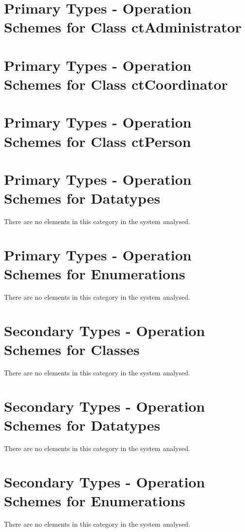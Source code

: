 \section{Primary Types - Operation Schemes for Class ctAdministrator} 
\label{OM-CM-PTClass-ctAdministrator}

\section{Primary Types - Operation Schemes for Class ctCoordinator} 
\label{OM-CM-PTClass-ctCoordinator}

\section{Primary Types - Operation Schemes for Class ctPerson} 
\label{OM-CM-PTClass-ctPerson}




\section{Primary Types - Operation Schemes for Datatypes}
There are no elements in this category in the system analysed.




\section{Primary Types - Operation Schemes for Enumerations}
There are no elements in this category in the system analysed.







\section{Secondary Types - Operation Schemes for Classes}
There are no elements in this category in the system analysed.





\section{Secondary Types - Operation Schemes for Datatypes}
There are no elements in this category in the system analysed.



\section{Secondary Types - Operation Schemes for Enumerations}
There are no elements in this category in the system analysed.


